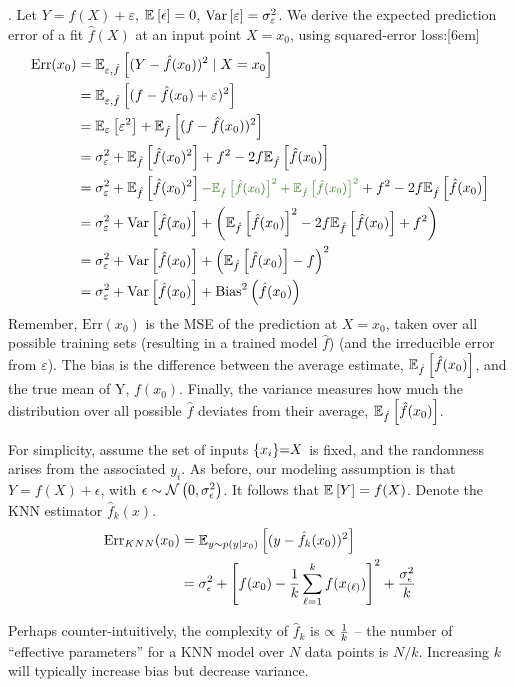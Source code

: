 \documentclass[11pt]{article}
\begin{document}
\myspace
\p {}. Let $Y = f(X) + \varepsilon$, $\E{\epsilon} = 0$, $\Var{\varepsilon} = \sigma_\varepsilon^2$. We derive the expected prediction error of a fit $\hat f (X)$ at an input point $X = x_0$, using squared-error loss:[6em]
\begin{align}
\text{Err}(x_0) &= \E[\varepsilon, \hat f]{(Y - \hat f (x_0))^2 \mid X=x_0} \\
&= \E[\varepsilon, \hat f]{(f - \hat f (x_0) + \varepsilon)^2} \\ 
&= \E[\varepsilon]{\varepsilon^2} + \E[\hat f]{(f - \hat f (x_0))^2} \\
&= \sigma_\varepsilon^2 + \E[\hat f]{\hat f (x_0)^2} + f^2 - 2f\E[\hat f]{\hat f (x_0)} \\
&= \sigma_\varepsilon^2 + \E[\hat f]{\hat f (x_0)^2} \mgreen{
	- \E[\hat f]{\hat f (x_0)}^2 + \E[\hat f]{\hat f (x_0)}^2
}
+ f^2 - 2f\E[\hat f]{\hat f (x_0)} \\
&= \sigma_\varepsilon^2 + \Var{\hat f (x_0)} + \left( \E[\hat f]{\hat f (x_0)}^2 - 2f \E[\hat f]{\hat f (x_0)} + f^2\right) \\
&= \sigma_\varepsilon^2 + \Var{\hat f (x_0)} + \left(\E[\hat f]{\hat f (x_0)} - f\right)^2 \\
&=  \sigma_\varepsilon^2 + \Var{\hat f (x_0)} + \text{Bias}^2\left(\hat f (x_0) \right)
\end{align}
Remember, $\text{Err}(x_0)$ is the MSE of the prediction at $X = x_0$, taken over all possible training sets (resulting in a trained model $\hat f$) (and the irreducible error from $\varepsilon$). The bias is the difference between the average estimate, $\E[\hat f]{\hat f (x_0)}$, and the true mean of Y, $f(x_0)$. Finally, the variance measures how much the distribution over all possible $\hat f$ deviates from their average, $\E[\hat f]{\hat f (x_0)}$. 


\begin{example}
	For simplicity, assume the set of inputs $\{ x_i \} \eq X$ is fixed, and the randomness arises from the associated $y_i$. As before, our modeling assumption is that $Y = f(X) + \epsilon$, with $\epsilon \sim \Gauss{0, \sigma_{\epsilon}^2}$. It follows that $\E{Y} = f(X)$. Denote the KNN estimator $\hat{f}_k(x)$. 
	\begin{align}
		\text{Err}_{KNN}(x_0)
			&= \E[y \sim p(y \mid x_0)]{
				(y - \hat{f}_{k}(x_0))^2	
			} \\
			&= \sigma_{\epsilon}^2 + \left[
				f(x_0) - \inv{k} \sum_{\ell = 1}^k f(x_{(\ell)})
			\right]^2 + \frac{\sigma_{\epsilon}^2}{k}
	\end{align}
	
	Perhaps counter-intuitively, the complexity of $\hat{f}_k$ is $\propto \inv{k}$ -- the number of ``effective parameters'' for a KNN model over $N$ data points is $N/k$. Increasing $k$ will typically increase bias but decrease variance.
\end{example}
\end{document}

